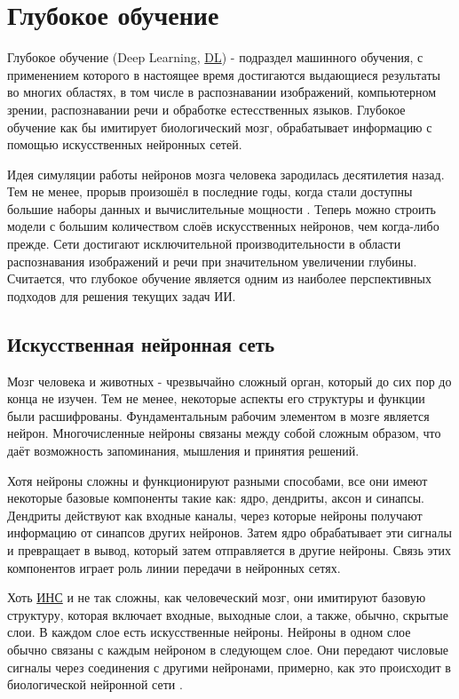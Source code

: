 \section{Глубокое обучение} \label{ch1:dl}

Глубокое обучение (Deep Learning, \hyperref[acr:dl]{DL}) - подраздел машинного обучения, с применением которого в настоящее время достигаются выдающиеся результаты во многих областях, в том числе в распознавании изображений, компьютерном зрении, распознавании речи и обработке естесственных языков. Глубокое обучение как бы имитирует биологический мозг, обрабатывает информацию с помощью искусственных нейронных сетей.

Идея симуляции работы нейронов мозга человека зародилась десятилетия назад. Тем не менее, прорыв произошёл в последние годы, когда стали доступны большие наборы данных и вычислительные мощности \cite{10.1145/2771283}. Теперь можно строить модели с большим количеством слоёв искусственных нейронов, чем когда-либо прежде. Сети достигают исключительной производительности в области распознавания изображений и речи при значительном увеличении глубины. Считается, что глубокое обучение является одним из наиболее перспективных подходов для решения текущих задач ИИ.

\subsection{Искусственная нейронная сеть}

Мозг человека и животных - чрезвычайно сложный орган, который до сих пор до конца не изучен. Тем не менее, некоторые аспекты его структуры и функции были расшифрованы. Фундаментальным рабочим элементом в мозге является нейрон. Многочисленные нейроны связаны между собой сложным образом, что даёт возможность запоминания, мышления и принятия решений.

Хотя нейроны сложны и функционируют разными способами, все они имеют некоторые базовые компоненты такие как: ядро, дендриты, аксон и синапсы. Дендриты действуют как входные каналы, через которые нейроны получают информацию от синапсов других нейронов. Затем ядро обрабатывает эти сигналы и превращает в вывод, который затем отправляется в другие нейроны. Связь этих компонентов играет роль линии передачи в нейронных сетях.

Хоть \hyperref[acr:ann]{ИНС} и не так сложны, как человеческий мозг, они имитируют базовую структуру, которая включает входные, выходные слои, а также, обычно, скрытые слои. В каждом слое есть искусственные нейроны. Нейроны в одном слое обычно связаны с каждым нейроном в следующем слое. Они передают числовые сигналы через соединения с другими нейронами, примерно, как это происходит в биологической нейронной сети \cite{296402}.

